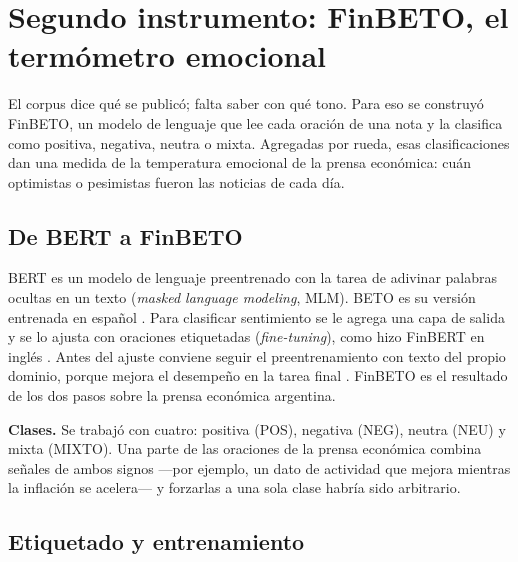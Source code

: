 \chapter{Segundo instrumento: FinBETO, el termómetro emocional}
\label{cap:finbeto}

El corpus dice qué se publicó; falta saber con qué tono. Para eso se construyó FinBETO, un
modelo de lenguaje que lee cada oración de una nota y la clasifica como positiva, negativa,
neutra o mixta. Agregadas por rueda, esas clasificaciones dan una medida de la temperatura
emocional de la prensa económica: cuán optimistas o pesimistas fueron las noticias de cada día.

\section{De BERT a FinBETO}

BERT \citep{devlin2019bert} es un modelo de lenguaje preentrenado con la tarea de adivinar
palabras ocultas en un texto (\textit{masked language modeling}, MLM). BETO es su versión
entrenada en español \citep{canete2020beto}. Para clasificar sentimiento se le agrega una capa
de salida y se lo ajusta con oraciones etiquetadas (\textit{fine-tuning}), como hizo FinBERT en
inglés \citep{araci2019finbert}. Antes del ajuste conviene seguir el preentrenamiento con texto
del propio dominio, porque mejora el desempeño en la tarea final \citep{gururangan2020dapt}.
FinBETO es el resultado de los dos pasos sobre la prensa económica argentina.

\textbf{Clases.} Se trabajó con cuatro: positiva (POS), negativa (NEG), neutra (NEU) y mixta
(MIXTO). Una parte de las oraciones de la prensa económica combina señales de ambos signos —por
ejemplo, un dato de actividad que mejora mientras la inflación se acelera— y forzarlas a una
sola clase habría sido arbitrario.

\section{Etiquetado y entrenamiento}

